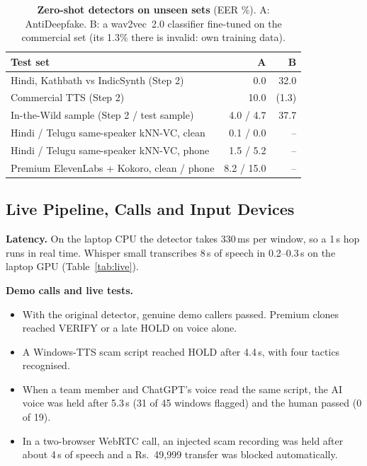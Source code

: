 \documentclass[10pt,a4paper,twocolumn]{article}
\begin{document}
\begin{table}[t]
\centering\scriptsize
\caption{\textbf{Zero-shot detectors on unseen sets} (EER \%). A: AntiDeepfake. B: a wav2vec~2.0 classifier fine-tuned on the commercial set (its 1.3\% there is invalid: own training data).}
\label{tab:zeroshot}
\setlength{\tabcolsep}{3pt}
\begin{tabular}{@{}p{}rr@{}}
\toprule
\textbf{Test set} & \textbf{A} & \textbf{B}\\
\midrule
Hindi, Kathbath vs IndicSynth (Step 2) & 0.0 & 32.0\\
Commercial TTS (Step 2) & 10.0 & (1.3)\\
In-the-Wild sample (Step 2 / test sample) & 4.0 / 4.7 & 37.7\\
Hindi / Telugu same-speaker kNN-VC, clean & 0.1 / 0.0 & --\\
Hindi / Telugu same-speaker kNN-VC, phone & 1.5 / 5.2 & --\\
Premium ElevenLabs + Kokoro, clean / phone & 8.2 / 15.0 & --\\
\bottomrule
\end{tabular}
\end{table}

\subsection{Live Pipeline, Calls and Input Devices}
\textbf{Latency.} On the laptop CPU the detector takes 330\,ms per window, so a 1\,s hop runs in real time. Whisper small transcribes 8\,s of speech in 0.2--0.3\,s on the laptop GPU (Table~\ref{tab:live}).

\textbf{Demo calls and live tests.}
\begin{itemize}\setlength\itemsep{0pt}
\item With the original detector, genuine demo callers passed. Premium clones reached VERIFY or a late HOLD on voice alone.
\item A Windows-TTS scam script reached HOLD after 4.4\,s, with four tactics recognised.
\item When a team member and ChatGPT's voice read the same script, the AI voice was held after 5.3\,s (31 of 45 windows flagged) and the human passed (0 of 19).
\item In a two-browser WebRTC call, an injected scam recording was held after about 4\,s of speech and a Rs.~49,999 transfer was blocked automatically.
\end{itemize}
\end{document}
